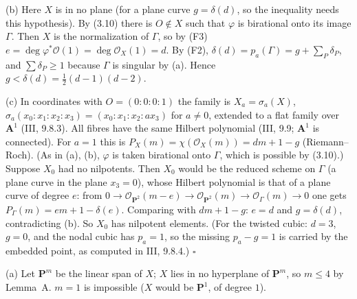 \documentclass[11pt]{article}
\begin{document}
(b) Here $X$ is in no plane (for a plane curve $g=\delta(d)$, so the inequality needs this hypothesis). By (3.10) there is $O\notin X$ such that $\varphi$ is birational onto its image $\Gamma$. Then $X$ is the normalization of $\Gamma$, so by (F3) $e=\deg\varphi^*\mathcal O(1)=\deg\mathcal O_X(1)=d$. By (F2), $\delta(d)=p_a(\Gamma)=g+\sum_P\delta_P$, and $\sum\delta_P\ge1$ because $\Gamma$ is singular by (a). Hence $g<\delta(d)=\frac12(d-1)(d-2)$.

(c) In coordinates with $O=(0:0:0:1)$ the family is $X_a=\sigma_a(X)$, $\sigma_a(x_0:x_1:x_2:x_3)=(x_0:x_1:x_2:ax_3)$ for $a\ne0$, extended to a flat family over $\mathbf A^1$ (III, 9.8.3). All fibres have the same Hilbert polynomial (III, 9.9; $\mathbf A^1$ is connected). For $a=1$ this is $P_X(m)=\chi(\mathcal O_X(m))=dm+1-g$ (Riemann--Roch). (As in (a), (b), $\varphi$ is taken birational onto $\Gamma$, which is possible by (3.10).) Suppose $X_0$ had no nilpotents. Then $X_0$ would be the reduced scheme on $\Gamma$ (a plane curve in the plane $x_3=0$), whose Hilbert polynomial is that of a plane curve of degree $e$: from $0\to\mathcal O_{\mathbf P^2}(m-e)\to\mathcal O_{\mathbf P^2}(m)\to\mathcal O_\Gamma(m)\to0$ one gets $P_\Gamma(m)=em+1-\delta(e)$. Comparing with $dm+1-g$: $e=d$ and $g=\delta(d)$, contradicting (b). So $X_0$ has nilpotent elements. (For the twisted cubic: $d=3$, $g=0$, and the nodal cubic has $p_a=1$, so the missing $p_a-g=1$ is carried by the embedded point, as computed in III, 9.8.4.) \hfill$\square$

\pf
(a) Let $\mathbf P^m$ be the linear span of $X$; $X$ lies in no hyperplane of $\mathbf P^m$, so $m\le4$ by Lemma~A. $m=1$ is impossible ($X$ would be $\mathbf P^1$, of degree $1$).
\end{document}
